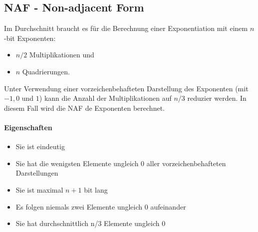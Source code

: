 \subsection{NAF - Non-adjacent Form}

Im Durchschnitt braucht es für die Berechnung einer Exponentiation mit einem $n$-bit Exponenten:

\begin{itemize}
    \item $n/2$ Multiplikationen und
    \item $n$ Quadrierungen.
\end{itemize}

Unter Verwendung einer vorzeichenbehafteten Darstellung des Exponenten (mit $-1, 0$ und $1$) kann die Anzahl der Multiplikationen auf $n/3$ reduzier werden. In diesem Fall
wird die NAF de Exponenten berechnet.

\paragraph{Eigenschaften}

\begin{itemize}
    \item Sie ist eindeutig
    \item Sie hat die wenigsten Elemente ungleich 0 aller vorzeichenbehafteten Darstellungen
    \item Sie ist maximal $n+1$ bit lang 
    \item Es folgen niemals zwei Elemente ungleich 0 aufeinander 
    \item Sie hat durchschnittlich n/3 Elemente ungleich 0
\end{itemize}